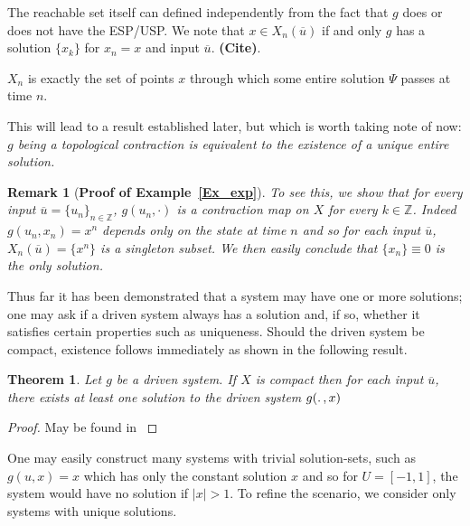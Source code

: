 \documentclass[a4paper,12pt,twoside]{report}
\newtheorem{Definition}{Definition}[]
\newtheorem{Theorem}{Theorem}[]
\newtheorem{Remark}{Remark}[]
\begin{document}
The reachable set itself can defined independently from the fact that $g$ does or does not have the ESP/USP. We note that $x\in{X_n(\overline{u})}$ if and only $g$ has a solution $\{x_k\}$ for $x_n=x$ and input $\overline{u}$. \textbf{(Cite)}.

$X_n$ is exactly the set of points $x$ through which some entire solution $\Psi$ passes at time $n$.

This will lead to a result established later, but which is worth taking note of now: \textit{$g$ being a topological contraction is equivalent to the existence of a unique entire solution.}


\begin{Remark}
  [\bf Proof of Example~\ref{Ex_exp}] \label{rem_proofEx} \rm
  To see this, we show that for every input $\overline{u}=\{u_n\}_{n\in\mathbb{Z}}$, $g(u_n,\cdot)$ is a contraction map on $X$ for every $k\in\mathbb{Z}$. 
  Indeed $g(u_n,x_n)=x^n$ depends only on the state at time $n$ and so for each input $\overline{u}$, $X_n(\overline{u})=\{x^n\}$ is a singleton subset.
  We then easily conclude that $\{x_n\}\equiv0$ is the only solution. 
\end{Remark} 

Thus far it has been demonstrated that a system may have one or more solutions; one may ask if a driven system always has a solution and, if so, whether it satisfies certain properties such as uniqueness. 
Should the driven system be compact, existence follows immediately as shown in the following result.

\begin{Theorem}\label{Thm_CompactExistence}
 Let $g$ be a driven system.  If $X$ is compact then for each input $\overline{u}$, there exists at least one solution to the driven system $g(\ldotp, x)$
\end{Theorem}
\begin{proof}
  May be found in \cite{kloeden2011nonautonomous, manjunath2014dynamics, manjunath2013echo}
\end{proof}

One may easily construct many systems with trivial solution-sets, such as $g(u,x)=x$ which has only the constant solution $x$ and so for $U=[-1,1]$, the system would have no solution if $|x|>1$. To refine the scenario, we consider only systems with unique solutions. 
\end{document}

